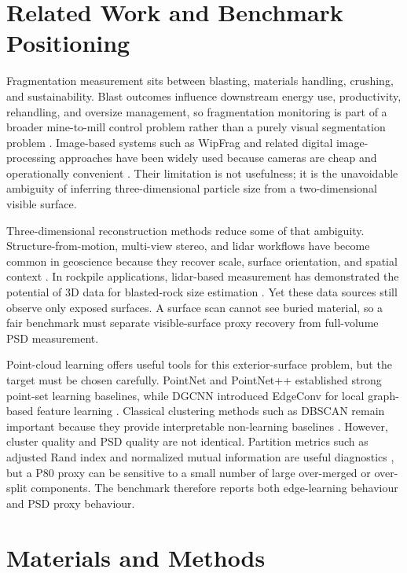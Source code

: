 \documentclass[11pt]{article}
\begin{document}
\section{Related Work and Benchmark Positioning}
Fragmentation measurement sits between blasting, materials handling, crushing, and sustainability. Blast outcomes influence downstream energy use, productivity, rehandling, and oversize management, so fragmentation monitoring is part of a broader mine-to-mill control problem rather than a purely visual segmentation problem \cite{laurence2011,cunningham1983,ouchterlony2005}. Image-based systems such as WipFrag and related digital image-processing approaches have been widely used because cameras are cheap and operationally convenient \cite{palangio1995,siddiqui2009}. Their limitation is not usefulness; it is the unavoidable ambiguity of inferring three-dimensional particle size from a two-dimensional visible surface.

Three-dimensional reconstruction methods reduce some of that ambiguity. Structure-from-motion, multi-view stereo, and lidar workflows have become common in geoscience because they recover scale, surface orientation, and spatial context \cite{westoby2012,eltner2016,anderson2019}. In rockpile applications, lidar-based measurement has demonstrated the potential of 3D data for blasted-rock size estimation \cite{engin2020,onederra2015}. Yet these data sources still observe only exposed surfaces. A surface scan cannot see buried material, so a fair benchmark must separate visible-surface proxy recovery from full-volume PSD measurement.

Point-cloud learning offers useful tools for this exterior-surface problem, but the target must be chosen carefully. PointNet and PointNet++ established strong point-set learning baselines, while DGCNN introduced EdgeConv for local graph-based feature learning \cite{qi2017pointnet,qi2017pointnetpp,wang2019}. Classical clustering methods such as DBSCAN remain important because they provide interpretable non-learning baselines \cite{ester1996}. However, cluster quality and PSD quality are not identical. Partition metrics such as adjusted Rand index and normalized mutual information are useful diagnostics \cite{hubert1985,vinh2010}, but a P80 proxy can be sensitive to a small number of large over-merged or over-split components. The benchmark therefore reports both edge-learning behaviour and PSD proxy behaviour.

\section{Materials and Methods}
\end{document}
